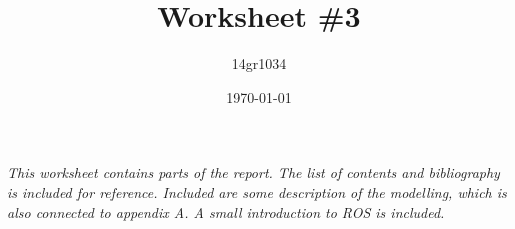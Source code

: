 \documentclass[a4paper,11pt,oneside,fleqn]{memoir}
\begin{document}
\author{14gr1034}
\title{Worksheet \#3}
\date{\today}
\maketitle
\begin{center}
\textit{This worksheet contains parts of the report. The list of
contents and bibliography is included for reference. Included are some
description of the modelling, which is also connected to appendix
A. A small introduction to ROS is included.}
\end{center}






%
\end{document}
